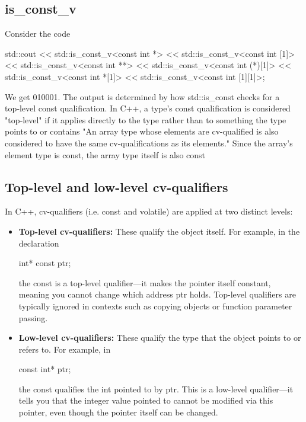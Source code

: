 \documentclass{report}
\begin{document}
\subsection{is\_const\_v}
\bigbreak \noindent 
Consider the code
\bigbreak \noindent 
\begin{cppcode}
std::cout << std::is_const_v<const int *>
              << std::is_const_v<const int [1]>
              << std::is_const_v<const int **>
              << std::is_const_v<const int (*)[1]>
              << std::is_const_v<const int *[1]>
              << std::is_const_v<const int [1][1]>;
\end{cppcode}
We get 010001. The output is determined by how std::is\_const checks for a top‑level const qualification. In C++, a type’s const qualification is considered "top‑level" if it applies directly to the type rather than to something the type points to or contains
\bigbreak \noindent 
"An array type whose elements are cv-qualified is also considered to have the same cv-qualifications as its elements." Since the array's element type is const, the array type itself is also const

\bigbreak \noindent 
\subsection{Top-level and low-level cv-qualifiers}
\bigbreak \noindent 
In C++, cv-qualifiers (i.e. const and volatile) are applied at two distinct levels:
\begin{itemize}
    \item \textbf{Top-level cv-qualifiers:} These qualify the object itself. For example, in the declaration
        \bigbreak \noindent 
        \begin{cppcode}
        int* const ptr;
        \end{cppcode}
        \bigbreak \noindent 
        the const is a top-level qualifier—it makes the pointer itself constant, meaning you cannot change which address ptr holds. Top-level qualifiers are typically ignored in contexts such as copying objects or function parameter passing.
    \item \textbf{Low-level cv-qualifiers:} These qualify the type that the object points to or refers to. For example, in
        \bigbreak \noindent 
        \begin{cppcode}
        const int* ptr;
        \end{cppcode}
        \bigbreak \noindent 
        the const qualifies the int pointed to by ptr. This is a low-level qualifier—it tells you that the integer value pointed to cannot be modified via this pointer, even though the pointer itself can be changed.

\end{itemize}
\end{document}
